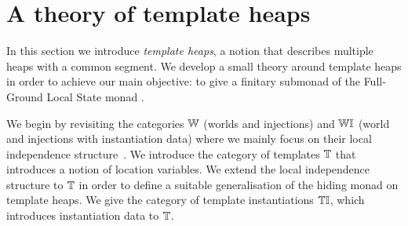 
\section{A theory of template heaps}

In this section we introduce \emph{template heaps}, a notion that describes multiple heaps with a common segment.
We develop a small theory around template heaps in order to achieve our main objective: 
to give a finitary submonad of the Full-Ground Local State monad \cite{kammar2017monad}.

We begin by revisiting the categories $\mathbb{W}$ (worlds and injections) and $\mathbb{W}\mathbb{I}$ (world and injections with instantiation data) where we mainly focus on their local independence structure~\cite{simpson2018category}.
We introduce the category of templates $\mathbb{T}$ that introduces a notion of location variables.
We extend the local independence structure to $\mathbb{T}$ in order to define a suitable generalisation of the hiding monad on template heaps.
We give the category of template instantiations ${\mathbb{T}\mathbb{I}}$, which introduces instantiation data to $\mathbb{T}$.






